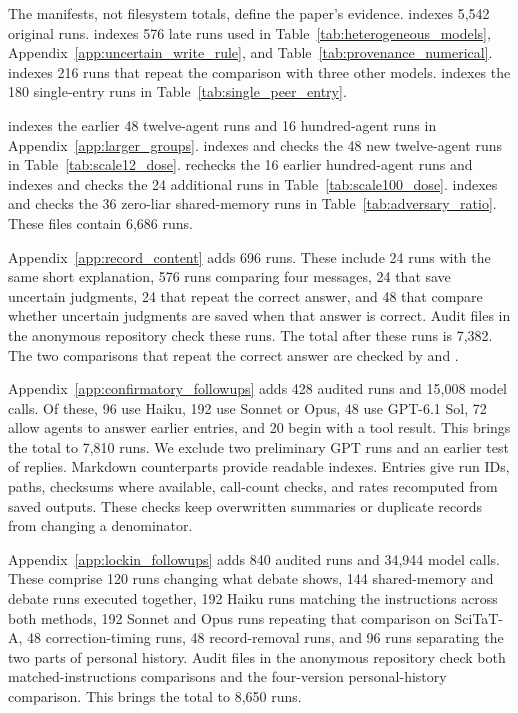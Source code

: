 The manifests, not filesystem totals, define the paper's evidence.  indexes 5,542 original runs.  indexes 576 late runs used in Table~\ref{tab:heterogeneous_models}, Appendix~\ref{app:uncertain_write_rule}, and Table~\ref{tab:provenance_numerical}.  indexes 216 runs that repeat the comparison with three other models.  indexes the 180 single-entry runs in Table~\ref{tab:single_peer_entry}.

 indexes the earlier 48 twelve-agent runs and 16 hundred-agent runs in Appendix~\ref{app:larger_groups}.  indexes and checks the 48 new twelve-agent runs in Table~\ref{tab:scale12_dose}.  rechecks the 16 earlier hundred-agent runs and indexes and checks the 24 additional runs in Table~\ref{tab:scale100_dose}.  indexes and checks the 36 zero-liar shared-memory runs in Table~\ref{tab:adversary_ratio}. These files contain 6,686 runs.

Appendix~\ref{app:record_content} adds 696 runs. These include 24 runs with the same short explanation, 576 runs comparing four messages, 24 that save uncertain judgments, 24 that repeat the correct answer, and 48 that compare whether uncertain judgments are saved when that answer is correct. Audit files in the anonymous repository check these runs. The total after these runs is 7,382. The two comparisons that repeat the correct answer are checked by  and .

Appendix~\ref{app:confirmatory_followups} adds 428 audited runs and 15,008 model calls. Of these, 96 use Haiku, 192 use Sonnet or Opus, 48 use GPT-6.1 Sol, 72 allow agents to answer earlier entries, and 20 begin with a tool result. This brings the total to 7,810 runs. We exclude two preliminary GPT runs and an earlier test of replies. Markdown counterparts provide readable indexes. Entries give run IDs, paths, checksums where available, call-count checks, and rates recomputed from saved outputs. These checks keep overwritten summaries or duplicate records from changing a denominator.

Appendix~\ref{app:lockin_followups} adds 840 audited runs and 34,944 model calls. These comprise 120 runs changing what debate shows, 144 shared-memory and debate runs executed together, 192 Haiku runs matching the instructions across both methods, 192 Sonnet and Opus runs repeating that comparison on SciTaT-A, 48 correction-timing runs, 48 record-removal runs, and 96 runs separating the two parts of personal history. Audit files in the anonymous repository check both matched-instructions comparisons and the four-version personal-history comparison. This brings the total to 8,650 runs.

